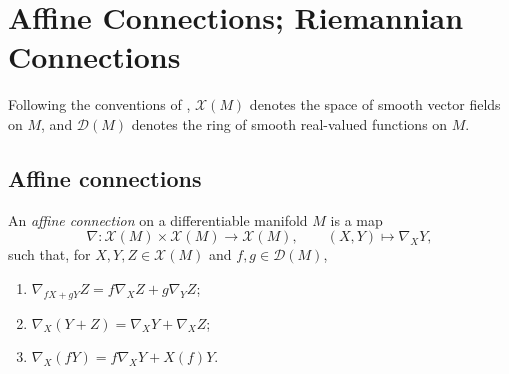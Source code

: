 \chapter{Affine Connections; Riemannian Connections}
\label{chap:dc-affine-connections-riemannian-connections}

Following the conventions of \cite{doCarmo}, $\mathcal{X}(M)$ denotes the space
of smooth vector fields on $M$, and $\mathcal{D}(M)$ denotes the ring of smooth
real-valued functions on $M$.

\section{Affine connections}

\begin{definition}
  \label{def:dc-ch2-2-1}
  \leanok
  An \emph{affine connection} on a differentiable manifold $M$ is a map
  \[
    \nabla\colon \mathcal{X}(M)\times\mathcal{X}(M)\longrightarrow\mathcal{X}(M),
    \qquad (X,Y)\longmapsto\nabla_XY,
  \]
  such that, for $X,Y,Z\in\mathcal{X}(M)$ and $f,g\in\mathcal{D}(M)$,
  \begin{enumerate}
    \item[(i)] $\nabla_{fX+gY}Z=f\nabla_XZ+g\nabla_YZ$;
    \item[(ii)] $\nabla_X(Y+Z)=\nabla_XY+\nabla_XZ$;
    \item[(iii)] $\nabla_X(fY)=f\nabla_XY+X(f)Y$.
  \end{enumerate}
\end{definition}

